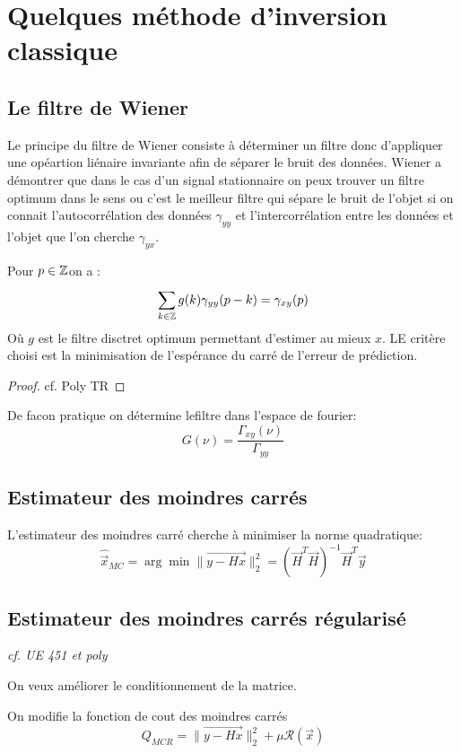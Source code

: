 \documentclass[main.tex]{subfiles}
\begin{document}
\section{Quelques méthode d'inversion classique}
\subsection{Le filtre de Wiener}

Le principe du filtre de Wiener consiste à déterminer un filtre donc
d'appliquer une opéartion liénaire invariante afin de séparer le bruit
des données. Wiener a démontrer que dans le cas d'un signal
stationnaire on peux trouver un filtre optimum dans le sens ou c'est
le meilleur filtre qui sépare le bruit de l'objet si on connait
l'autocorrélation des données $\gamma_{yy}$ et l'intercorrélation entre les
données et l'objet que l'on cherche $\gamma_{yx}$.
\begin{prop}
  Pour $p \in\mathbb{Z} $on a :
  \[
\sum_{k\in\mathbb{Z}}^{}g(k)\gamma_{yy}(p-k) = \gamma_{xy}(p)
\]
Où $g$ est le filtre disctret optimum permettant d'estimer au mieux
$x$. LE critère choisi est la minimisation de l'espérance du carré de
l'erreur de prédiction.
\end{prop}
\begin{proof}
  cf. Poly TR
\end{proof}
\begin{prop}
  De facon pratique on détermine lefiltre dans l'espace de fourier:
  \[
    G(\nu) = \frac{\Gamma_{xy}(\nu)}{\Gamma_{yy}}
  \]
\end{prop}
\subsection{Estimateur des moindres carrés}
\begin{prop}
  L'estimateur des moindres carré cherche à minimiser la norme quadratique:
  \[
\hat{\vec{x}}_{MC} = \arg\min \| \vec{y-Hx}\|_2^2 = (\vec{H}^T\vec{H})^{-1}\vec{H}^{T}\vec{y}
  \]
\end{prop}

\subsection{Estimateur des moindres carrés régularisé}

\emph{cf. UE 451 et poly}


On veux améliorer le conditionnement de la matrice.
\begin{prop}
  On modifie la fonction de cout des moindres carrés
  \[
    Q_{MCR}= \| \vec{y-Hx}\|_2^2 + \mu \mathcal{R}(\vec{x})
  \]
\end{prop}
\end{document}
